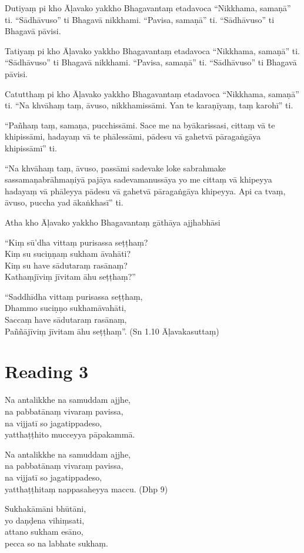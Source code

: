 Dutiyaṃ pi kho Āḷavako yakkho Bhagavantaṃ etadavoca “Nikkhama, samaṇā” ti. “Sādhāvuso” ti Bhagavā nikkhami. “Pavisa, samaṇā” ti. “Sādhāvuso” ti Bhagavā pāvisi.

Tatiyaṃ pi kho Āḷavako yakkho Bhagavantaṃ etadavoca “Nikkhama, samaṇā” ti. “Sādhāvuso” ti Bhagavā nikkhami. “Pavisa, samaṇā” ti. “Sādhāvuso” ti Bhagavā pāvisi.

Catutthaṃ pi kho Āḷavako yakkho Bhagavantaṃ etadavoca “Nikkhama, samaṇā” ti. “Na khvāhaṃ taṃ, āvuso, nikkhamissāmi. Yan te karaṇīyaṃ, taṃ karohī” ti.

“Pañhaṃ taṃ, samaṇa, pucchissāmi. Sace me na byākarissasi, cittaṃ vā te khipissāmi, hadayaṃ vā te phālessāmi, pādesu vā gahetvā pāragaṅgāya khipissāmī” ti.

“Na khvāhaṃ taṃ, āvuso, passāmi sadevake loke sabrahmake sassamaṇabrāhmaṇiyā pajāya sadevamanussāya yo me cittaṃ vā khipeyya hadayaṃ vā phāleyya pādesu vā gahetvā pāragaṅgāya khipeyya. Api ca tvaṃ, āvuso, puccha yad ākaṅkhasī” ti.

Atha kho Āḷavako yakkho Bhagavantaṃ gāthāya ajjhabhāsi

“Kiṃ sū’dha vittaṃ purisassa seṭṭhaṃ?\\
Kiṃ su suciṇṇaṃ sukham āvahāti?\\
Kiṃ su have sādutaraṃ rasānaṃ?\\
Kathaṃjīviṃ jīvitam āhu seṭṭhaṃ?”

“Saddhīdha vittaṃ purisassa seṭṭhaṃ,\\
Dhammo suciṇṇo sukhamāvahāti,\\
Saccaṃ have sādutaraṃ rasānaṃ,\\
Paññājīviṃ jīvitam āhu seṭṭhaṃ”. (Sn 1.10 Āḷavakasuttaṃ)

\section*{Reading 3}

Na antalikkhe na samuddam ajjhe,\\
na pabbatānaṃ vivaraṃ pavissa,\\
na vijjatī so jagatippadeso,\\
yatthaṭṭhito mucceyya pāpakammā.

Na antalikkhe na samuddam ajjhe,\\
na pabbatānaṃ vivaraṃ pavissa,\\
na vijjatī so jagatippadeso,\\
yatthaṭṭhitaṃ nappasaheyya maccu. (Dhp 9)

Sukhakāmāni bhūtāni,\\
yo daṇḍena vihiṃsati,\\
attano sukham esāno,\\
pecca so na labhate sukhaṃ.

